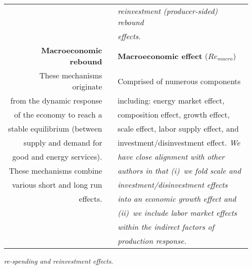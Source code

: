 \begin{table}
\begin{center}
\begin{tabular}{ r l l }
                                   &                                             & \emph{reinvestment (producer-sided) rebound} \\
                                   &                                             & \emph{effects.}     \\ 
\midrule
\textbf{Macroeconomic rebound}     &                                             & \textbf{Macroeconomic effect} ($Re_{macro}$) \\
These mechanisms originate         &                                             & Comprised of numerous components \\
from the dynamic response          &                                             & including: energy market effect, \\
of the economy to reach a          &                                             & composition effect, growth effect, \\
stable equilibrium (between        &                                             & scale effect, labor supply effect, and \\
supply and demand for              &                                             & investment/disinvestment effect. \emph{We} \\
good and energy services).         &                                             & \emph{have close alignment with other} \\
These mechanisms combine           &                                             & \emph{authors in that (i)~we fold scale and} \\
various short and long run         &                                             & \emph{investment/disinvestment effects} \\
effects.                           &                                             & \emph{into an economic growth effect and} \\
                                   &                                             & \emph{(ii)~we include labor market effects } \\ 
                                   &                                             & \emph{within the indirect factors of } \\
                                   &                                             & \emph{production response.} \\
\bottomrule
\end{tabular}
\end{center}
\end{table}



\emph{re-spending and reinvestment effects.}